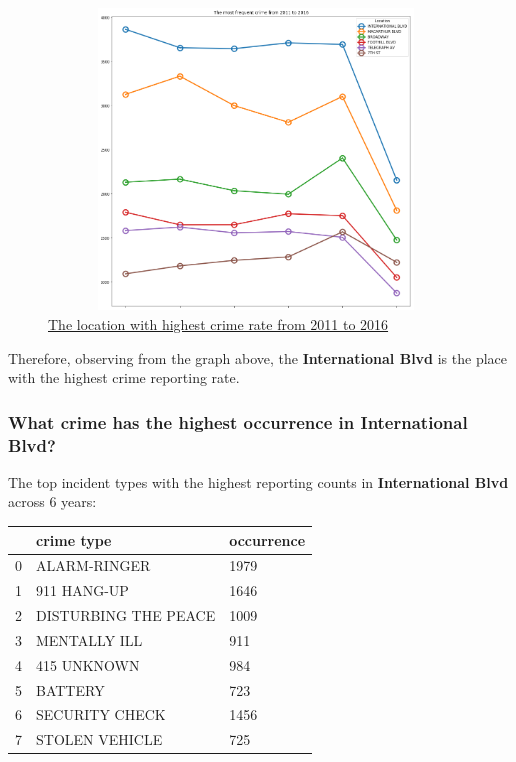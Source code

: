 \documentclass{article} %
\begin{document}
\begin{figure}[H]
	\begin{center}
		\includegraphics[height=8cm, width=11cm]{3.png}
	\end{center}
	\caption{\hyperref[appendix:plot2]{The location with highest crime rate from 2011 to 2016}}
\end{figure}

Therefore, observing from the graph above, the \textbf{International Blvd} is the place with the highest crime reporting rate.


\subsubsection{What crime has the highest occurrence in International Blvd?}

The top incident types with the highest reporting counts in \textbf{International Blvd} across 6 years:

\begin{center}
\begin{tabular}{|p{1cm}|p{6cm}|p{3cm}|}
	\toprule
	{} &            crime type &  occurrence \\
	\midrule
	0 &          ALARM-RINGER &        1979 \\
	1 &           911 HANG-UP &        1646 \\
	2 &  DISTURBING THE PEACE &        1009 \\
	3 &          MENTALLY ILL &         911 \\
	4 &           415 UNKNOWN &         984 \\
	5 &               BATTERY &         723 \\
	6 &        SECURITY CHECK &        1456 \\
	7 &        STOLEN VEHICLE &         725 \\
	\bottomrule
\end{tabular}
\end{center}
\end{document}
